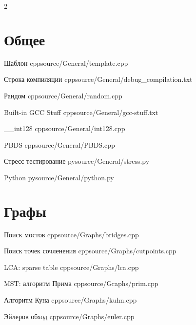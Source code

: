 \documentclass[landscape, 9pt, a4paper, oneside, twocolumn]{extarticle}
\begin{document}
\begin{minipage}{0.48\textwidth}
	\begin{multicols}{2}
		\tableofcontents
	\end{multicols}
\end{minipage}



\newpage

\ShowUsage
\ShowComplexity
\HideAuthor


\newpage

\section{Общее}

\Algorithm
{Шаблон}
{}
{}
{cpp}{source/General/template.cpp}
{}

\Algorithm
{Строка компиляции}
{}
{}
{cpp}{source/General/debug_compilation.txt}
{}

\Algorithm
{Рандом}
{}
{}
{cpp}{source/General/random.cpp}
{}

\Algorithm
{Built-in GCC Stuff}
{}
{}
{cpp}{source/General/gcc-stuff.txt}
{}

\Algorithm
{\_\_int128}
{}
{}
{cpp}{source/General/int128.cpp}
{}

\Algorithm
{PBDS}
{}
{}
{cpp}{source/General/PBDS.cpp}
{}

\Algorithm
{Стресс-тестирование}
{}
{}
{py}{source/General/stress.py}
{}

\Algorithm
{Python}
{}
{}
{py}{source/General/python.py}
{}

\section {Графы}

\Algorithm
{Поиск мостов}
{}
{}
{cpp}{source/Graphs/bridges.cpp}
{}

\Algorithm
{Поиск точек сочленения}
{}
{}
{cpp}{source/Graphs/cutpoints.cpp}
{}

\Algorithm
{LCA: sparse table}
{}
{}
{cpp}{source/Graphs/lca.cpp}
{}

\Algorithm
{MST: алгоритм Прима}
{}
{}
{cpp}{source/Graphs/prim.cpp}
{}

\Algorithm
{Алгоритм Куна}
{}
{}
{cpp}{source/Graphs/kuhn.cpp}
{}

\Algorithm
{Эйлеров обход}
{}
{}
{cpp}{source/Graphs/euler.cpp}
{}
\end{document}
